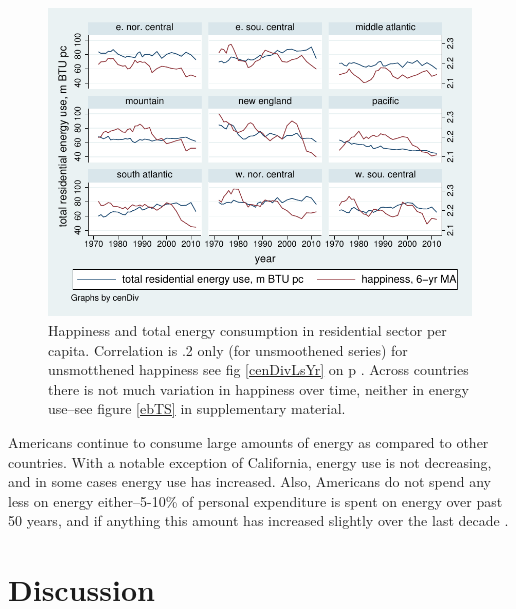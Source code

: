 \documentclass[10pt, letterpaper]{article}
\begin{document}
\begin{spacing}{1.4}
\begin{figure}[H]
 \includegraphics[width=5in]{graphsAndTables/cenDivLsYrSm.pdf}\centering
\caption{%
Happiness and total energy consumption
  in residential sector per capita. Correlation is .2 only (for
  unsmoothened series) 
 for unsmotthened happiness see fig \ref{cenDivLsYr} on
  p \pageref{cenDivLsYr}. Across countries there is not much variation in
  happiness over time, neither in energy use--see figure \ref{ebTS} in
  supplementary material. }\label{cenDivLsYrSm}
\end{figure}

Americans continue to consume large amounts of energy as compared to other
countries.  With a notable exception of California, energy use is
not decreasing, and in some cases energy use has increased. 
Also, Americans do not spend any less  on energy either--5-10\% of personal
expenditure is spent on energy over past 50 years, and if anything this amount
has  increased slightly  over the last decade \cite{bea-2-8-5}.


\section*{\large \bf Discussion}



\end{spacing}
\end{document}
